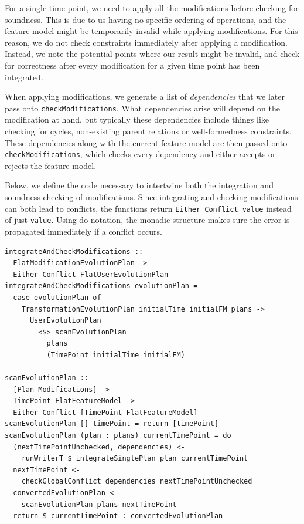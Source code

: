 \documentclass[a4paper,english]{ifimaster}
\begin{document}
For a single time point, we need to apply all the modifications before checking for soundness. This is due to us having no specific ordering of operations, and the feature model might be temporarily invalid while applying modifications. For this reason, we do not check constraints immediately after applying a modification. Instead, we note the potential points where our result might be invalid, and check for correctness after every modification for a given time point has been integrated.

When applying modifications, we generate a list of \textit{dependencies} that we later pass onto \texttt{check\-Modifications}. What dependencies arise will depend on the modification at hand, but typically these dependencies include things like checking for cycles, non-existing parent relations or well-formedness constraints. These dependencies along with the current feature model are then passed onto \texttt{check\-Modifications}, which checks every dependency and either accepts or rejects the feature model.

Below, we define the code necessary to intertwine both the integration and soundness checking of modifications. Since integrating and checking modifications can both lead to conflicts, the functions return \texttt{Either Conflict value} instead of just \texttt{value}. Using do-notation, the monadic structure makes sure the error is propagated immediately if a conflict occurs.

\begin{verbatim}
integrateAndCheckModifications ::
  FlatModificationEvolutionPlan ->
  Either Conflict FlatUserEvolutionPlan
integrateAndCheckModifications evolutionPlan =
  case evolutionPlan of
    TransformationEvolutionPlan initialTime initialFM plans ->
      UserEvolutionPlan
        <$> scanEvolutionPlan
          plans
          (TimePoint initialTime initialFM)

scanEvolutionPlan ::
  [Plan Modifications] ->
  TimePoint FlatFeatureModel ->
  Either Conflict [TimePoint FlatFeatureModel]
scanEvolutionPlan [] timePoint = return [timePoint]
scanEvolutionPlan (plan : plans) currentTimePoint = do
  (nextTimePointUnchecked, dependencies) <-
    runWriterT $ integrateSinglePlan plan currentTimePoint
  nextTimePoint <-
    checkGlobalConflict dependencies nextTimePointUnchecked
  convertedEvolutionPlan <-
    scanEvolutionPlan plans nextTimePoint
  return $ currentTimePoint : convertedEvolutionPlan
\end{verbatim}
\end{document}
